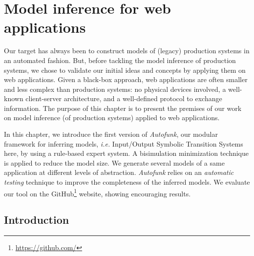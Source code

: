 \chapter{Model inference for web applications}
\label{sec:modelinf:webapps}

Our target has always been to construct models of (legacy)
production systems in an automated fashion. But, before tackling
the model inference of production systems, we chose to validate
our initial ideas and concepts by applying them on web
applications. Given a black-box approach, web applications are
often smaller and less complex than production systems: no
physical devices involved, a well-known client-server
architecture, and a well-defined protocol to exchange
information. The purpose of this chapter is to present the
premises of our work on model inference (of production systems)
applied to web applications.

In this chapter, we introduce the first version of
\textit{Autofunk}, our modular framework for inferring models,
\emph{i.e.} Input/Output Symbolic Transition Systems here, by
using a rule-based expert system. A bisimulation minimization
technique \cite{Park:1981:CAI:647210.720030} is applied to reduce
the model size. We generate several models of a same application
at different levels of abstraction. \textit{Autofunk} relies on
an \emph{automatic testing} technique to improve the completeness
of the inferred models. We evaluate our tool on the
GitHub\footnote{\url{https://github.com/}} website, showing
encouraging results.\\

\minitoc

\pagebreak

\section{Introduction}

